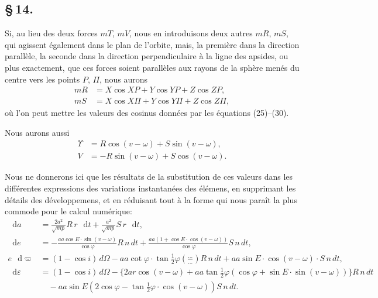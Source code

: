 \documentclass[12pt,a4paper]{article}
\newcommand{\dd}{\mathop{}\!\mathrm{d}}
\begin{document}
\newpage
\subsection*{\S\,14.}

Si, au lieu des deux forces $mT$, $mV$, nous en introduisons deux autres $mR$, $mS$, qui agissent \'{e}galement dans le plan de l'orbite, mais, la premi\`{e}re dans la direction parall\`{e}le, la seconde dans la direction perpendiculaire \`{a} la ligne des apsides, ou plus exactement, que ces forces soient parall\`{e}les aux rayons de la sph\`{e}re men\'{e}s du centre vers les points $P$, $\Pi$, nous aurons
\begin{align}
mR &= X\cos XP + Y\cos YP + Z\cos ZP, \tag{72} \\
mS &= X\cos X\Pi + Y\cos Y\Pi + Z\cos Z\Pi, \tag{73}
\end{align}
o\`{u} l'on peut mettre les valeurs des cosinus donn\'{e}es par les \'{e}quations (25)--(30).

Nous aurons aussi
\begin{align}
\Upsilon &= R\cos(v - \omega) + S\sin(v - \omega), \tag{74} \\
V &= -R\sin(v - \omega) + S\cos(v - \omega). \tag{75}
\end{align}

Nous ne donnerons ici que les r\'{e}sultats de la substitution de ces valeurs dans les diff\'{e}rentes expressions des variations instantan\'{e}es des \'{e}l\'{e}mens, en supprimant les d\'{e}tails des d\'{e}veloppemens, et en r\'{e}duisant tout \`{a} la forme qui nous para\^{i}t la plus commode pour le calcul num\'{e}rique:
\begin{align}
\dd a &= \frac{2a^2}{\sqrt{mp}} R\,r\,\dd t + \frac{a^2}{\sqrt{mp}} S\,r\,\dd t, \tag{76} \\
\dd e &= -\frac{aa\cos E \cdot \sin(v - \omega)}{\cos\varphi} R\,n\,dt + \frac{aa(1 + \cos E \cdot \cos(v - \omega))}{\cos\varphi} S\,n\,dt, \tag{77} \\
e\,\dd\varpi &= (1 - \cos i)\,d\Omega - aa\cot\varphi \cdot \tan\tfrac{1}{2}\varphi \left(\frac{\ldots}{\ldots}\right) R\,n\,dt + aa\sin E \cdot \cos(v - \omega) \cdot S\,n\,dt, \tag{78} \\
\dd\varepsilon &= (1 - \cos i)\,d\Omega - \{2ar\cos(v - \omega) + aa\tan\tfrac{1}{2}\varphi(\cos\varphi + \sin E \cdot \sin(v - \omega))\} R\,n\,dt \\
&\quad - aa\sin E(2\cos\varphi - \tan\tfrac{1}{2}\varphi \cdot \cos(v - \omega)) S\,n\,dt. \tag{79}
\end{align}
\end{document}
